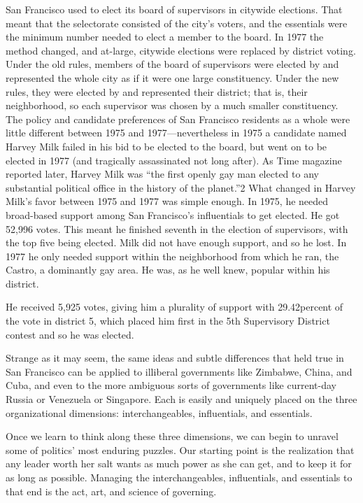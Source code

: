 \documentclass[10pt]{article}
\begin{document}
{\large San Francisco used to elect its board of supervisors in citywide
elections. That meant that the selectorate consisted of the city's voters, and
the essentials were the minimum number needed to elect a member to the board. In
1977 the method changed, and at-large, citywide elections were replaced by
district voting. Under the old rules, members of the board of supervisors were
elected by and represented the whole city as if it were one large constituency.
Under the new rules, they were elected by and represented their district; that
is, their neighborhood, so each supervisor was chosen by a much smaller
constituency. The policy and candidate preferences of San Francisco residents as
a whole were little different between 1975 and 1977---nevertheless in 1975 a
candidate named Harvey Milk failed in his bid to be elected to the board, but
went on to be elected in 1977 (and tragically assassinated not long after). As
Time magazine reported later, Harvey Milk was ``the first openly gay man elected
to any substantial political office in the history of the planet.''2 What changed
in Harvey Milk's favor between 1975 and 1977 was simple enough. In 1975, he
needed broad-based support among San Francisco's influentials to get elected. He
got 52,996 votes. This meant he finished seventh in the election of supervisors,
with the top five being elected. Milk did not have enough support, and so he
lost. In 1977 he only needed support within the neighborhood from which he ran,
the Castro, a dominantly gay area. He was, as he well knew, popular within his
district.}

{\large He received 5,925 votes, giving him a plurality of support with
29.42percent of the vote in district 5, which placed him first in the 5th
Supervisory District contest and so he was elected.}

{\large Strange as it may seem, the same ideas and subtle differences that held
true in San Francisco can be applied to illiberal governments like Zimbabwe,
China, and Cuba, and even to the more ambiguous sorts of governments like
current-day Russia or Venezuela or Singapore. Each is easily and uniquely placed
on the three organizational dimensions: interchangeables, influentials, and
essentials.}

{\large Once we learn to think along these three dimensions, we can begin to
unravel some of politics' most enduring puzzles. Our starting point is the
realization that any leader worth her salt wants as much power as she can get,
and to keep it for as long as possible. Managing the interchangeables,
influentials, and essentials to that end is the act, art, and science of
governing.}
\end{document}
